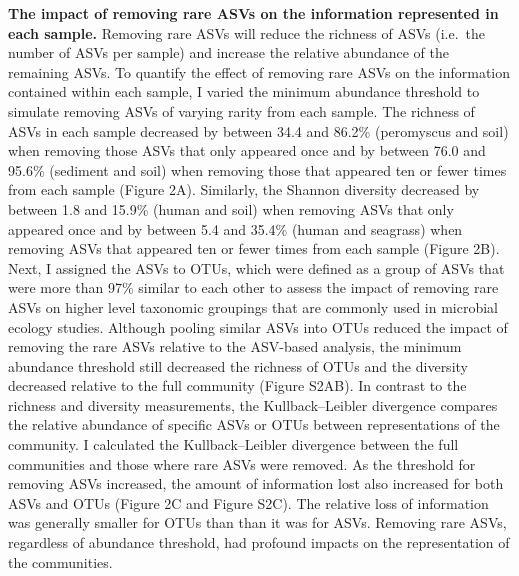 \documentclass[
]{article}
\begin{document}
\textbf{The impact of removing rare ASVs on the information represented
in each sample.} Removing rare ASVs will reduce the richness of ASVs
(i.e.~the number of ASVs per sample) and increase the relative abundance
of the remaining ASVs. To quantify the effect of removing rare ASVs on
the information contained within each sample, I varied the minimum
abundance threshold to simulate removing ASVs of varying rarity from
each sample. The richness of ASVs in each sample decreased by between
34.4 and 86.2\% (peromyscus and soil) when removing those ASVs that only
appeared once and by between 76.0 and 95.6\% (sediment and soil) when
removing those that appeared ten or fewer times from each sample (Figure
2A). Similarly, the Shannon diversity decreased by between 1.8 and
15.9\% (human and soil) when removing ASVs that only appeared once and
by between 5.4 and 35.4\% (human and seagrass) when removing ASVs that
appeared ten or fewer times from each sample (Figure 2B). Next, I
assigned the ASVs to OTUs, which were defined as a group of ASVs that
were more than 97\% similar to each other to assess the impact of
removing rare ASVs on higher level taxonomic groupings that are commonly
used in microbial ecology studies. Although pooling similar ASVs into
OTUs reduced the impact of removing the rare ASVs relative to the
ASV-based analysis, the minimum abundance threshold still decreased the
richness of OTUs and the diversity decreased relative to the full
community (Figure S2AB). In contrast to the richness and diversity
measurements, the Kullback--Leibler divergence compares the relative
abundance of specific ASVs or OTUs between representations of the
community. I calculated the Kullback--Leibler divergence between the
full communities and those where rare ASVs were removed. As the
threshold for removing ASVs increased, the amount of information lost
also increased for both ASVs and OTUs (Figure 2C and Figure S2C). The
relative loss of information was generally smaller for OTUs than than it
was for ASVs. Removing rare ASVs, regardless of abundance threshold, had
profound impacts on the representation of the communities.
\end{document}
